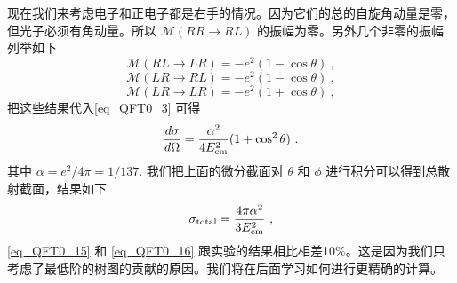 现在我们来考虑电子和正电子都是右手的情况。因为它们的总的自旋角动量是零，但光子必须有角动量。所以 $\mathcal M (RR \rightarrow RL)$ 的振幅为零。另外几个非零的振幅列举如下
\begin{equation}
\mathcal M(RL\rightarrow LR) = - e^2(1-\cos\theta)  ~,
\end{equation}
\begin{equation}
\mathcal M(LR\rightarrow RL) = - e^2 (1-\cos\theta)~,
\end{equation}
\begin{equation}
\mathcal M(LR \rightarrow LR) = - e^2(1+\cos\theta)~,
\end{equation}
把这些结果代入\autoref{eq_QFT0_3} 可得
\begin{equation}\label{eq_QFT0_15}
\frac{d\sigma}{d\Omega}  = \frac{\alpha^2}{4E_{\rm cm}^2}(1+\cos^2\theta) ~.
\end{equation} 
其中 $\alpha = e^2/4\pi=1/137$. 我们把上面的微分截面对 $\theta$ 和 $\phi$ 进行积分可以得到总散射截面，结果如下
\begin{equation}\label{eq_QFT0_16}
\sigma_{\rm total} = \frac{4\pi \alpha^2}{3E_{\rm cm}^2}~,
\end{equation}
\autoref{eq_QFT0_15} 和 \autoref{eq_QFT0_16} 跟实验的结果相比相差10\%。这是因为我们只考虑了最低阶的树图的贡献的原因。我们将在后面学习如何进行更精确的计算。




























